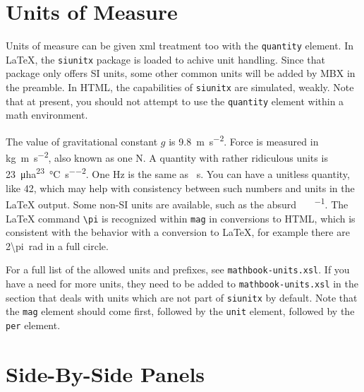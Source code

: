 \documentclass[10pt,]{article}
\theoremstyle{plain}
\theoremstyle{definition}
\theoremstyle{definition}
\theoremstyle{definition}
\theoremstyle{definition}
\theoremstyle{definition}
\theoremstyle{definition}
\numberwithin{equation}{section}
\begin{document}
\section[{Units of Measure}]{Units of Measure}\label{section-20}
\hypertarget{p-642}{}%
Units of measure can be given xml treatment too with the \lstinline?quantity? element. In \LaTeX{}, the \lstinline?siunitx? package is loaded to achive unit handling. Since that package only offers SI units, some other common units will be added by MBX in the preamble. In HTML, the capabilities of \lstinline?siunitx? are simulated, weakly. Note that at present, you should not attempt to use the \lstinline?quantity? element within a math environment.%
\par
\hypertarget{p-643}{}%
The value of gravitational constant \(g\) is \SI{9.8}{\meter\per\second\tothe{2}}. Force is measured in \si{\kilo\gram\meter\per\second\tothe{2}}, also known as one \si{\newton}. A quantity with rather ridiculous units is \SI{23}{\micro\hectare\tothe{23}\per\degreeCelsius\per\second\tothe{2}}. One \si{\hertz} is the same as \si{\per\second}. You can have a unitless quantity, like \num{42}, which may help with consistency between such numbers and units in the \LaTeX{} output. Some non-SI units are available, such as the absurd \si{\degreeFahrenheit\foot\pound\per\gallon}.  The \LaTeX{} command \lstinline?\pi? is recognized within \lstinline?mag? in conversions to HTML, which is consistent with the behavior with a conversion to \LaTeX{}, for example there are \SI{2\pi}{\radian} in a full circle.%
\par
\hypertarget{p-644}{}%
For a full list of the allowed units and prefixes, see \lstinline?mathbook-units.xsl?. If you have a need for more units, they need to be added to \lstinline?mathbook-units.xsl? in the section that deals with units which are not part of \lstinline?siunitx? by default.  Note that the \lstinline?mag? element should come first, followed by the \lstinline?unit? element, followed by the \lstinline?per? element.%
\typeout{************************************************}
\typeout{************************************************}
\section[{Side-By-Side Panels}]{Side-By-Side Panels}\label{section-side-by-side}
\end{document}
